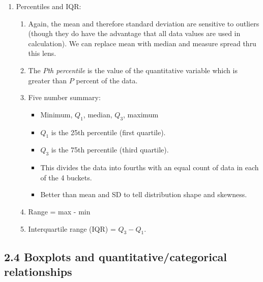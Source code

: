 \documentclass{article}
\begin{document}
\begin{enumerate}
\item Percentiles and IQR:
\begin{enumerate}
\item Again, the mean and therefore standard deviation are sensitive to outliers (though they do have the advantage that all data values are used in calculation). We can replace mean with median and measure spread thru this lens.
\item The \emph{$P$th percentile} is the value of the quantitative variable which is greater than $P$ percent of the data.
\item Five number summary:
\begin{itemize}
\item Minimum, $Q_1$, median, $Q_3$, maximum
\item $Q_1$ is the 25th percentile (first quartile).
\item $Q_3$ is the 75th percentile (third quartile).
\item This divides the data into fourths with an equal count of data in each of the 4 buckets.
\item Better than mean and SD to tell distribution shape and skewness.
\end{itemize}
\item Range = max - min
\item Interquartile range (IQR) = $Q_3-Q_1$.
\end{enumerate}

\end{enumerate}

\subsection{2.4 Boxplots and quantitative/categorical relationships}
\end{document}

